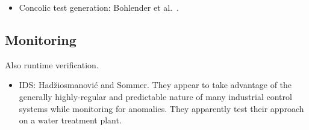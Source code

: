 \begin{itemize}

\item Concolic test generation: Bohlender et al.~\cite{bohlender:concolic}.

\end{itemize}

\subsection{Monitoring}

Also runtime verification.

\begin{itemize}

\item IDS: Had\u ziosmanovi\'c and Sommer. They appear to take advantage of the
generally highly-regular and predictable nature of many industrial control
systems while monitoring for anomalies. They apparently test their approach on a
water treatment plant.


\end{itemize}

